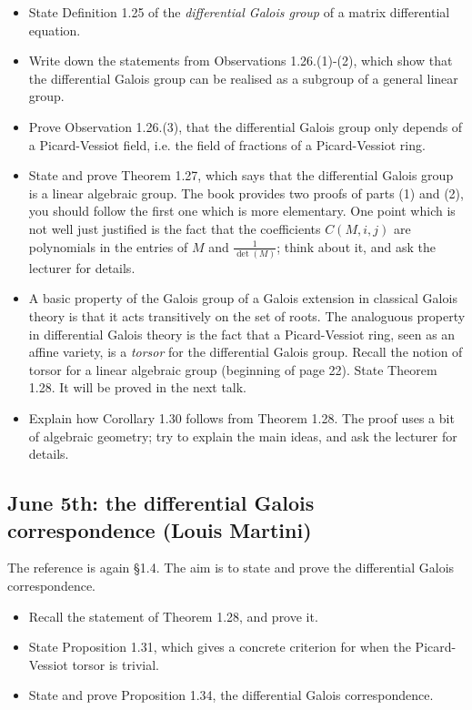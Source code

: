 \documentclass{amsart}
\theoremstyle{definition}
\theoremstyle{remark}
\begin{document}
\begin{itemize}
\item State Definition 1.25 of the \emph{differential Galois group} of a matrix differential equation.
\item Write down the statements from Observations 1.26.(1)-(2), which show that the differential Galois group can be realised as a subgroup of a general linear group.
\item Prove Observation 1.26.(3), that the differential Galois group only depends of a Picard-Vessiot field, i.e. the field of fractions of a Picard-Vessiot ring.
\item State and prove Theorem 1.27, which says that the differential Galois group is a linear algebraic group. The book provides two proofs of parts (1) and (2), you should follow the first one which is more elementary. One point which is not well just justified is the fact that the coefficients \(C(M,i,j)\) are polynomials in the entries of \(M\) and \(\frac{1}{\det(M)}\); think about it, and ask the lecturer for details.
\item A basic property of the Galois group of a Galois extension in classical Galois theory is that it acts transitively on the set of roots. The analoguous property in differential Galois theory is the fact that a Picard-Vessiot ring, seen as an affine variety, is a \emph{torsor} for the differential Galois group. Recall the notion of torsor for a linear algebraic group (beginning of page 22). State Theorem 1.28. It will be proved in the next talk.
\item Explain how Corollary 1.30 follows from Theorem 1.28. The proof uses a bit of algebraic geometry; try to explain the main ideas, and ask the lecturer for details. 
\end{itemize}

\subsection{June 5th: the differential Galois correspondence (Louis Martini)}

The reference is again \S 1.4. The aim is to state and prove the differential Galois correspondence.

\begin{itemize}
\item Recall the statement of Theorem 1.28, and prove it.
\item State Proposition 1.31, which gives a concrete criterion for when the Picard-Vessiot torsor is trivial.
\item State and prove Proposition 1.34, the differential Galois correspondence.
\end{itemize}
\end{document}
